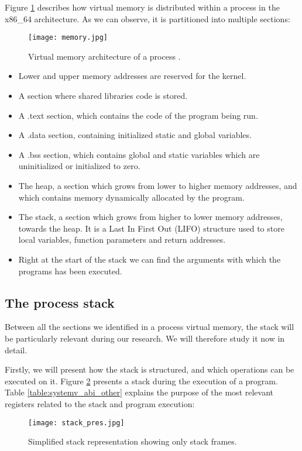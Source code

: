 Figure \ref{fig:mem_proc_arch} describes how virtual memory is distributed within a process in the x86\_64 architecture. As we can observe, it is partitioned into multiple sections:
\begin{figure}[htbp]
	\centering
	\texttt{[image: memory.jpg]}
	\caption{Virtual memory architecture of a process \cite{mem_arch_proc}.}
	\label{fig:mem_proc_arch}
\end{figure}
\begin{itemize}
\item Lower and upper memory addresses are reserved for the kernel.
\item A section where shared libraries code is stored.
\item A .text section, which contains the code of the program being run.
\item A .data section, containing initialized static and global variables.
\item A .bss section, which contains global and static variables which are uninitialized or initialized to zero.
\item The heap, a section which grows from lower to higher memory addresses, and which contains memory dynamically allocated by the program.
\item The stack, a section which grows from higher to lower memory addresses, towards the heap. It is a Last In First Out (LIFO) structure used to store local variables, function parameters and return addresses.
\item Right at the start of the stack we can find the arguments with which the programs has been executed.
\end{itemize}

\subsection{The process stack} \label{subsection:stack}
Between all the sections we identified in a process virtual memory, the stack will be particularly relevant during our research. We will therefore study it now in detail. 

Firstly, we will present how the stack is structured, and which operations can be executed on it. Figure \ref{fig:stack_pres} presents a stack during the execution of a program. Table \ref{table:systemv_abi_other} explains the purpose of the most relevant registers related to the stack and program execution:

\begin{figure}[htbp]
	\centering
	\texttt{[image: stack\_pres.jpg]}
	\caption{Simplified stack representation showing only stack frames.}
	\label{fig:stack_pres}
\end{figure}


